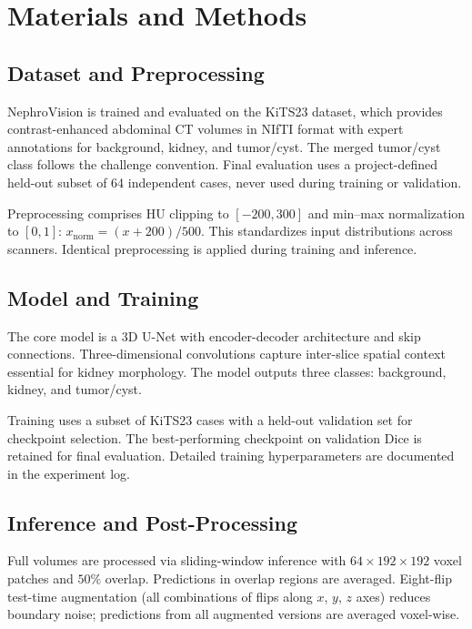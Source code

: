 \section{Materials and Methods}

\subsection{Dataset and Preprocessing}

NephroVision is trained and evaluated on the KiTS23 dataset, which provides contrast-enhanced abdominal CT volumes in NIfTI format with expert annotations for background, kidney, and tumor/cyst. The merged tumor/cyst class follows the challenge convention. Final evaluation uses a project-defined held-out subset of 64 independent cases, never used during training or validation.

Preprocessing comprises HU clipping to $[-200, 300]$ and min--max normalization to $[0, 1]$: $x_{\text{norm}} = (x + 200)/500$. This standardizes input distributions across scanners. Identical preprocessing is applied during training and inference.

\subsection{Model and Training}

The core model is a 3D U-Net with encoder-decoder architecture and skip connections. Three-dimensional convolutions capture inter-slice spatial context essential for kidney morphology. The model outputs three classes: background, kidney, and tumor/cyst.

Training uses a subset of KiTS23 cases with a held-out validation set for checkpoint selection. The best-performing checkpoint on validation Dice is retained for final evaluation. Detailed training hyperparameters are documented in the experiment log.

\subsection{Inference and Post-Processing}

Full volumes are processed via sliding-window inference with $64 \times 192 \times 192$ voxel patches and $50\%$ overlap. Predictions in overlap regions are averaged. Eight-flip test-time augmentation (all combinations of flips along $x$, $y$, $z$ axes) reduces boundary noise; predictions from all augmented versions are averaged voxel-wise.

